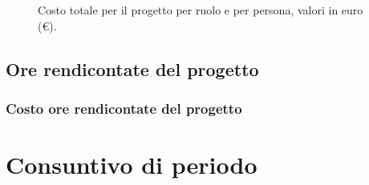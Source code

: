\begin{figure}[H]
\label{tab:cgen1}

  \caption{Costo totale per il progetto {\proj} per ruolo e per persona, valori in euro (\euro).}
\end{figure}


\pagebreak[4]



\subsection{Ore rendicontate del progetto}
\subsubsection{Costo ore rendicontate del progetto}

\section{Consuntivo di periodo} \label{sec:consuntivo}



